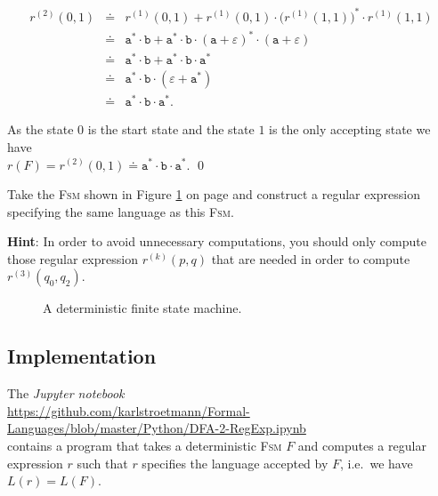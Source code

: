 \begin{enumerate}
            \begin{eqnarray*}
                  r^{(2)}(0, 1)
            & \doteq & r^{(1)}(0, 1) + 
                  r^{(1)}(0, 1) \cdot \bigl(r^{(1)}(1, 1)\bigr)^* \cdot r^{(1)}(1, 1) \\
            & \doteq & \texttt{a}^* \cdot \texttt{b} + 
                  \texttt{a}^* \cdot \texttt{b} \cdot (\texttt{a} + \varepsilon)^* \cdot (\texttt{a} + \varepsilon) \\
            & \doteq & \texttt{a}^* \cdot \texttt{b} + \texttt{a}^* \cdot \texttt{b} \cdot \texttt{a}^* \\
            & \doteq & \texttt{a}^* \cdot \texttt{b} \cdot (\varepsilon + \texttt{a}^*) \\
            & \doteq & \texttt{a}^* \cdot \texttt{b} \cdot \texttt{a}^*.
        \end{eqnarray*}
\end{enumerate}
As the state 0 is the start state and the state $1$ is the only accepting state we have
\\[0.2cm]
\hspace*{1.3cm}
$r(F) = r^{(2)}(0, 1) \doteq \texttt{a}^* \cdot \texttt{b} \cdot \texttt{a}^*$.
\qed
\pagebreak

\exerciseEng
Take the \textsc{Fsm} shown in Figure \ref{fig:exercise-13.eps} on page
\pageref{fig:exercise-13.eps} and construct a regular expression specifying the same language as this
\textsc{Fsm}.
\vspace*{0.1cm}

\noindent
\textbf{Hint}: In order to avoid unnecessary computations, you should only compute those regular expression
$r^{(k)}(p, q)$ that are needed in order to compute $r^{(3)}(q_0, q_2)$. 
\eox

\begin{figure}[!ht]
  \centering
{}
\caption{A deterministic finite state machine.}
\label{fig:exercise-13.eps}
\end{figure}

\subsection{Implementation}
The \textsl{Jupyter notebook} 
\\[0.2cm]
\hspace*{1.3cm}
\href{https://github.com/karlstroetmann/Formal-Languages/blob/master/Python/DFA-2-RegExp.ipynb}{https://github.com/karlstroetmann/Formal-Languages/blob/master/Python/DFA-2-RegExp.ipynb}
\\[0.2cm]
contains a program that takes a deterministic \textsc{Fsm} $F$ and computes a regular expression $r$ such that
$r$ specifies the language accepted by $F$, i.e.~we have $L(r) = L(F)$.

